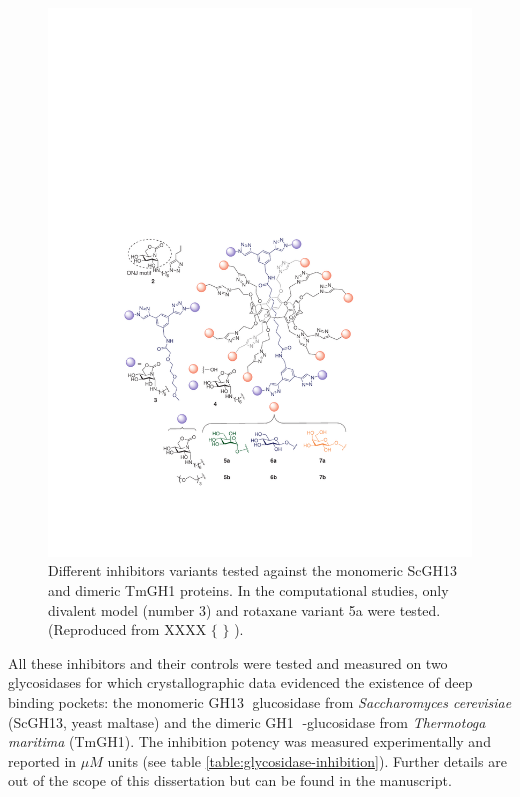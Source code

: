 \begin{figure}[H] %
	\begin{Center}
		\includegraphics[width=\textwidth]{./figures/06/glyco-inhibitors.pdf}
	\end{Center}
	\cprotect\caption[Tested inhibitors against ScGH13 and TmGH1]{Different inhibitors variants tested against the monomeric ScGH13 and dimeric TmGH1 proteins. In the computational studies, only divalent model (number 3) and rotaxane variant 5a were tested. (Reproduced from XXXX $ \{ $ $ \} $ ).}
	\label{fig:rotaxane-compounds}
\end{figure}



All these inhibitors and their controls were tested and measured on two glycosidases for which crystallographic data evidenced the existence of deep binding pockets: the monomeric GH13 glucosidase from \textit{Saccharomyces cerevisiae} (ScGH13, yeast maltase) and the dimeric GH1 -glucosidase from \textit{Thermotoga maritima} (TmGH1). The inhibition potency was measured experimentally and reported in $ \mu M $ units (see table \ref{table:glycosidase-inhibition}). Further details are out of the scope of this dissertation but can be found in the manuscript.


